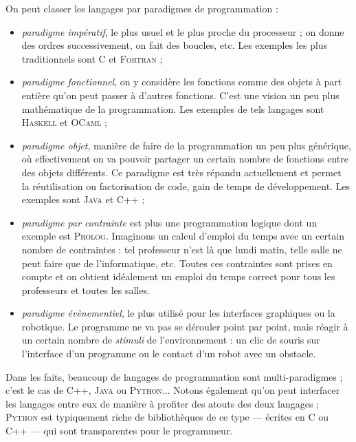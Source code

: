 On peut classer les langages par paradigmes de programmation :
\begin{itemize}
\item \emph{paradigme impératif}, le plus usuel et le plus proche du processeur ; on donne des ordres successivement, on fait des boucles, etc. Les exemples les plus traditionnels sont C et \textsc{Fortran} ;
\item \emph{paradigme fonctionnel}, on y considère les fonctions comme des objets à part entière qu'on peut passer à d'autres fonctions. C'est une vision un peu plus mathématique de la programmation. Les exemples de tels langages sont \textsc{Haskell} et \textsc{OCaml} ;
\item \emph{paradigme objet}, manière de faire de la programmation un peu plus générique, où effectivement on va pouvoir partager un certain nombre de fonctions entre des objets différents. Ce paradigme est très répandu actuellement et permet la réutilisation ou factorisation de code, gain de temps de développement. Les exemples sont \textsc{Java} et C++ ;
\item \emph{paradigme par contrainte} est plus une programmation logique dont un exemple est \textsc{Prolog}. Imaginons un calcul d'emploi du temps avec un certain nombre de contraintes : tel professeur n'est là que lundi matin, telle salle ne peut faire que de l'informatique, etc. Toutes ces contraintes sont prises en compte et on obtient idéalement un emploi du temps correct pour tous les professeurs et toutes les salles.
\item \emph{paradigme évènementiel}, le plus utilisé pour les interfaces graphiques ou la robotique. Le programme ne va pas se dérouler point par point, mais réagir à un certain nombre de \textit{stimuli} de l'environnement : un clic de souris sur l'interface d'un programme ou le contact d'un robot avec un obstacle. 
\end{itemize}

Dans les faits, beaucoup de langages de programmation sont multi-paradigmes ; c'est le cas de C++, \textsc{Java} ou \textsc{Python}... Notons également qu'on peut interfacer les langages entre eux de manière à profiter des atouts des deux langages ; \textsc{Python} est typiquement riche de bibliothèques de ce type --- écrites en C ou C++ --- qui sont transparentes pour le programmeur.

